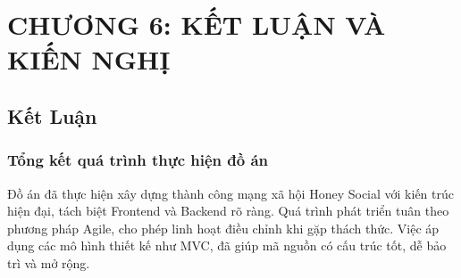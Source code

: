 
\newpage
\section{\textbf{CHƯƠNG 6: KẾT LUẬN VÀ KIẾN NGHỊ}}


\subsection{Kết Luận}

\subsubsection{Tổng kết quá trình thực hiện đồ án}
Đồ án đã thực hiện xây dựng thành công mạng xã hội Honey Social với kiến trúc hiện đại, tách biệt Frontend và Backend rõ ràng. Quá trình phát triển tuân theo phương pháp Agile, cho phép linh hoạt điều chỉnh khi gặp thách thức. Việc áp dụng các mô hình thiết kế như MVC, đã giúp mã nguồn có cấu trúc tốt, dễ bảo trì và mở rộng.

